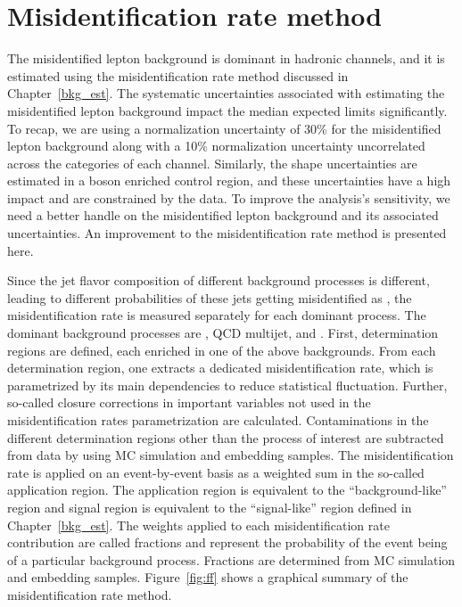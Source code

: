 %
%

\chapter{Misidentification rate method}
\label{fakefactor}

The misidentified lepton background is dominant in hadronic channels, and it is estimated using the misidentification rate method discussed in Chapter~\ref{bkg_est}. The systematic uncertainties associated with estimating the misidentified lepton background impact the median expected limits significantly. To recap, we are using a normalization uncertainty of 30\% for the misidentified lepton background along with a 10\% normalization uncertainty uncorrelated across the categories of each channel. Similarly, the shape uncertainties are estimated in a \PW boson enriched control region, and these uncertainties have a high impact and are constrained by the data. To improve the analysis's sensitivity, we need a better handle on the misidentified lepton background and its associated uncertainties. An improvement to the misidentification rate method is presented here.

Since the jet flavor composition of different background processes is different, leading to different probabilities of these jets getting misidentified as \tauh, the misidentification rate is measured separately for each dominant process. The dominant background processes are \wjets, QCD multijet, and \ttbar. First, determination regions are defined, each enriched in one of the above backgrounds. From each determination region, one extracts a dedicated misidentification rate, which is parametrized by its main dependencies to reduce statistical fluctuation. Further, so-called closure corrections in important variables not used in the misidentification rates parametrization are calculated. Contaminations in the different determination regions other than the process of interest are subtracted from data by using MC simulation and embedding samples. The misidentification rate is applied on an event-by-event basis as a weighted sum in the so-called application region. The application region is equivalent to the ``background-like'' region and signal region is equivalent to the ``signal-like'' region defined in Chapter~\ref{bkg_est}. The weights applied to each misidentification rate contribution are called fractions and represent the probability of the event being of a particular background process. Fractions are determined from MC simulation and embedding samples. Figure~\ref{fig:ff} shows a graphical summary of the misidentification rate method.

